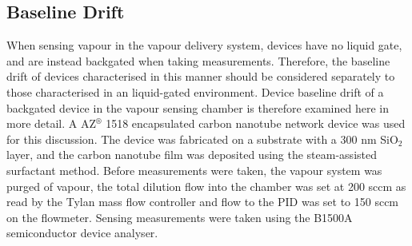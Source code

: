 \documentclass[
  a4paper,
]{scrbook}
\begin{document}
\hypertarget{sec-vapour-drift}{%
\subsection{Baseline Drift}\label{sec-vapour-drift}}

When sensing vapour in the vapour delivery system, devices have no
liquid gate, and are instead backgated when taking measurements.
Therefore, the baseline drift of devices characterised in this manner
should be considered separately to those characterised in an
liquid-gated environment. Device baseline drift of a backgated device in
the vapour sensing chamber is therefore examined here in more detail. A
AZ\(^\circledR\) 1518 encapsulated carbon nanotube network device was
used for this discussion. The device was fabricated on a substrate with
a 300 nm SiO\(_2\) layer, and the carbon nanotube film was deposited
using the steam-assisted surfactant method. Before measurements were
taken, the vapour system was purged of vapour, the total dilution flow
into the chamber was set at 200 sccm as read by the Tylan mass flow
controller and flow to the PID was set to 150 sccm on the flowmeter.
Sensing measurements were taken using the B1500A semiconductor device
analyser.
\end{document}
